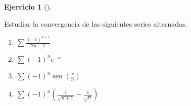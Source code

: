 \documentclass[
  spanish,
  a4paper,
]{scrreport}
\theoremstyle{definition}
\newtheorem{exercise}{Ejercicio}[chapter]
\theoremstyle{remark}
\begin{document}
\begin{exercise}[]\protect\hypertarget{exr-series-alternadas}{}\label{exr-series-alternadas}

Estudiar la convergencia de las siguientes series alternadas.

\begin{enumerate}
\def\labelenumi{\alph{enumi}.}
\item
  \(\sum \frac{(-1)^{n-1}}{2n-1}\)
\item
  \(\sum (-1)^ne^{-n}\)
\item
  \(\sum (-1)^n\operatorname{sen}\left(\frac{\pi}{n}\right)\)
\item
  \(\sum (-1)^n\left(\frac{1}{\sqrt{n+1}}-\frac{1}{\sqrt{n}}\right)\)
\end{enumerate}

\end{exercise}
\end{document}
